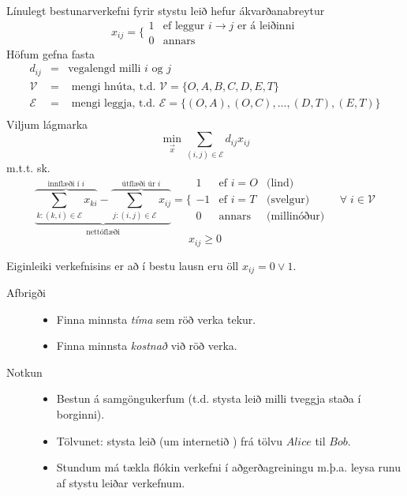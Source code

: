 Línulegt bestunarverkefni fyrir stystu leið hefur ákvarðanabreytur
\[ x_{ij}=\Big\{\begin{array}{ll} 1 & \textrm{ef leggur }i\to j\textrm{ er á leiðinni}\\ 0 & \textrm{annars}\end{array}\]
Höfum gefna fasta
\begin{eqnarray*}
d_{ij} &=& \textrm{vegalengd milli } i \textrm{ og } j\\
\mathcal{V}&=& \textrm{ mengi hnúta, t.d. } \mathcal{V}=\{O,A,B,C,D,E,T\}\\
\mathcal{E}&=& \textrm{ mengi leggja, t.d. } \mathcal{E}=\{(O,A),(O,C),...,(D,T),(E,T)\}\\
\end{eqnarray*}
Viljum lágmarka 
$$ \min_{\vec{x}} \sum_{(i,j)\in \mathcal{E}} d_{ij}x_{ij} $$
m.t.t. sk.
$$ \underbrace{\overbrace{\sum_{k:(k,i)\in \mathcal{E}}x_{ki}}^{\textrm{innflæði í }i}-\overbrace{\sum_{j:(i,j)\in \mathcal{E}}x_{ij}}^{\textrm{útflæði úr } i}}_{\textrm{nettóflæði}}=\Bigg\{\begin{array}{clc} 1 & \textrm{ef }i=O & \textrm{(lind)}\\-1 & \textrm{ef }i=T& \textrm{(svelgur)}\\0&\textrm{annars}& \textrm{(millinóður)}\end{array}\quad \forall\; i\in \mathcal{V}$$
$$x_{ij}\geq0$$
\begin{aths}Eiginleiki verkefnisins er að í bestu lausn eru öll $x_{ij}=0\vee1$. \end{aths}

\begin{description}
 \item[Afbrigði]\hspace{.1cm}
 \begin{itemize}
  \item Finna minnsta \emph{tíma} sem röð verka tekur.
  \item Finna minnsta \emph{kostnað} við röð verka.
 \end{itemize}
 \item[Notkun]\hspace{.1cm}
 \begin{itemize}
  \item Bestun á samgöngukerfum (t.d. stysta leið milli tveggja staða í borginni).
  \item Tölvunet: stysta leið (um internetið ) frá tölvu $Alice$ til $Bob$.
  \item Stundum má tækla flókin verkefni í aðgerðagreiningu m.þ.a. leysa runu af stystu leiðar verkefnum.
 \end{itemize}

\end{description}




